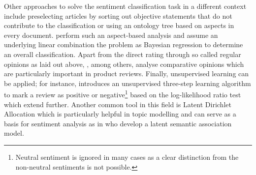 Other approaches to solve the sentiment classification task in a different context include preselecting articles by sorting out objective statements that do not contribute to the classification \parencite{Wiebe.1999} or using an ontology tree based on aspects in every document. \textcite{Wang.2010} perform such an aspect-based analysis and assume an underlying linear combination the problem as Bayesian regression to determine an overall classification. Apart from the direct rating through so called regular opinions as laid out above, \textcite{Ding.2009,Ganapathibhotla.2008,Jindal.2006}, among others, analyse comparative opinions which are particularly important in product reviews. Finally, unsupervised learning can be applied; for instance, \textcite{Turney.2002} introduces an unsupervised three-step learning algorithm to mark a review as positive or negative\footnote{Neutral sentiment is ignored in many cases as a clear distinction from the non-neutral sentiments is not possible.} based on the log-likelihood ratio test which \textcite{Yu.2003} extend further. Another common tool in this field is Latent Dirichlet Allocation \parencite{Blei.2003} which is particularly helpful in topic modelling and can serve as a basis for sentiment analysis as in \textcite{Guo.2009} who develop a latent semantic association model.
%
